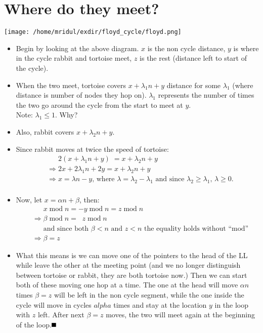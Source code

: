 \documentclass[11pt]{article}
\newcommand{\qed}{\mbox{}\hspace*{\fill}\nolinebreak\mbox{$\rule{0.6em}{0.6em}$}}
\begin{document}
\section{Where do they meet?}
\begin{centering}
    \texttt{[image: /home/mridul/exdir/floyd\_cycle/floyd.png]}
\end{centering}
\begin{itemize}
    \item Begin by looking at the above diagram. \(x\) is the non cycle
        distance, \(y\) is where in the cycle rabbit and tortoise meet, \(z\) is
        the rest (distance left to start of the cycle).
    \item When the two meet, tortoise covers \(x+\lambda_1 n+y\) distance for
        some \(\lambda_1\) (where distance is number of nodes they hop on).
        \(\lambda_1\) represents the number of times the two go around the cycle
        from the start to meet at \(y\). \\ Note: \(\lambda_1\le 1\). Why?
    \item Also, rabbit covers \(x+\lambda_2 n+y\).
    \item Since rabbit moves at twice the speed of tortoise: 
        \begin{align*}
            &\quad\;\; 2(x+\lambda_1 n+y)\;=x+\lambda_2 n +y\\
            &\Rightarrow 2x+2\lambda_1 n+2y=x+\lambda_2 n+y\\
            &\Rightarrow x = \lambda n - y\text{, where
            }\lambda=\lambda_2-\lambda_1\text{ and since
            }\lambda_2\ge\lambda_1\text{, }\lambda\ge 0.\\
        \end{align*}
    \item Now, let \(x=\alpha n+\beta\), then:
        \begin{align*}
            &\quad\;\;x\operatorname{mod} n=-y\operatorname{mod} n=z\operatorname{mod} n\\
            &\Rightarrow\beta\operatorname{mod} n = \;\;z\operatorname{mod} n\\
            &\quad\;\;\text{and since both }\beta<n\text{ and }z<n\text{ the equality
            holds without ``mod''}\\
            &\Rightarrow\beta = z
        \end{align*}
    \item What this means is we can move one of the pointers to the head of the
        LL while leave the other at the meeting point (and we no longer
        distinguish between tortoise or rabbit, they are both tortoise now.)
        Then we can start both of these moving one hop at a time. The one at the
        head will move \(\alpha n\) times \(\beta=z\) will be left in the non
        cycle segment, while the one inside the cycle will move in cycles
        \(alpha\) times and stay at the location \(y\) in the loop with \(z\)
        left. After next \(\beta=z\) moves, the two will meet again at the
        beginning of the loop.\qed
\end{itemize}
\end{document}
